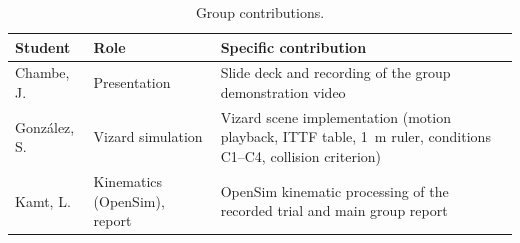 \begin{table}[h]
    \centering
    \caption{Group contributions.}\label{tab:contrib}
    \footnotesize
    \begin{tabularx}{\textwidth}{@{}l l Y@{}}
        \toprule
        \textbf{Student} & \textbf{Role}                & \textbf{Specific contribution}                                                                                          \\
        \midrule
        Chambe, J.       & Presentation                 & Slide deck and recording of the group demonstration video                                                               \\
        Gonz\'alez, S.   & Vizard simulation            & Vizard scene implementation (motion playback, ITTF table, \SI{1}{\meter} ruler, conditions C1--C4, collision criterion) \\
        Kamt, L.         & Kinematics (OpenSim), report & OpenSim kinematic processing of the recorded trial and main group report                                                \\
        \bottomrule
    \end{tabularx}
\end{table}